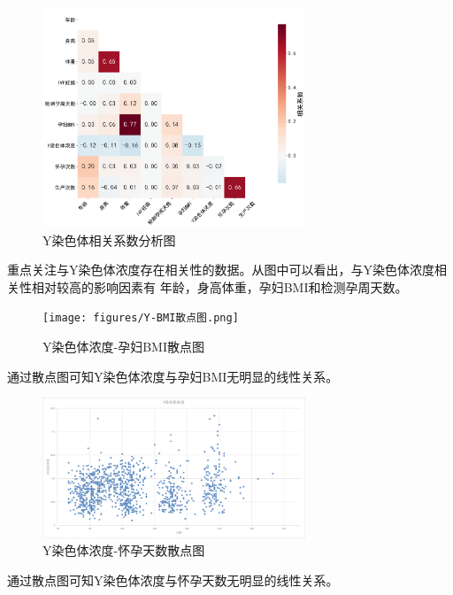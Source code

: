 \documentclass[withoutpreface,notoc]{cumcmthesis}
\begin{document}
	\begin{figure}[ht]
		\centering
		\includegraphics[width=0.7\textwidth]{figures/spearman5.png} 
		\caption{Y染色体相关系数分析图}
		\label{Y染色体相关系数}
	\end{figure}
	重点关注与Y染色体浓度存在相关性的数据。从图中可以看出，与Y染色体浓度相关性相对较高的影响因素有
	年龄，身高体重，孕妇BMI和检测孕周天数。


	\begin{figure}[ht]
		\centering
		\texttt{[image: figures/Y-BMI散点图.png]} 
		\caption{Y染色体浓度-孕妇BMI散点图}
		\label{Y-BMI散点}
	\end{figure}
	通过散点图可知Y染色体浓度与孕妇BMI无明显的线性关系。

	\begin{figure}[ht]
		\centering
		\includegraphics[width=0.7\textwidth]{figures/Y-天数散点.png} 
		\caption{Y染色体浓度-怀孕天数散点图}
		\label{Y-天数散点}
	\end{figure}
	通过散点图可知Y染色体浓度与怀孕天数无明显的线性关系。
\end{document}
